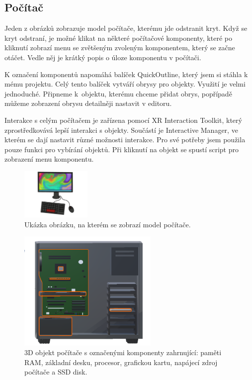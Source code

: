 \documentclass[12pt, a4paper,
twoside,        %
openright
]{report}
\begin{document}
\subsection{Počítač}	
Jeden z obrázků zobrazuje model počítače, kterému jde odstranit kryt. Když se kryt odstraní, je možné klikat na některé počítačové komponenty, které po kliknutí zobrazí menu se zvětšeným zvoleným komponentem, který se začne otáčet. Vedle něj je krátký popis o úloze komponentu v počítači.

K označení komponentů napomáhá balíček QuickOutline, který jsem si stáhla k mému projektu. Celý tento balíček vytváří obrysy pro objekty. Využití je velmi jednoduché. Připneme k~objektu, kterému chceme přidat obrys, popřípadě můžeme zobrazení obrysu detailněji nastavit v editoru. 

Interakce s celým počítačem je zařízena pomocí XR Interaction Toolkit, který zprostředkovává lepší interakci s objekty. Součástí je Interactive Manager, ve kterém se dají nastavit různé možnosti interakce. Pro své potřeby jsem použila pouze funkci pro vybírání objektů. Při kliknutí na objekt se spustí script pro zobrazení menu komponentu.


\begin{figure}[!h]
	\centering 
	\includegraphics[width=0.3\textwidth]{image/pcImage.png} 
	\caption{Ukázka obrázku, na kterém se zobrazí model počítače.} 
	\label{fig:pc_obrazek} 
\end{figure}

\begin{figure}[H]
	\centering 
	\includegraphics[width=0.6\textwidth]{image/pc.png} 
	\caption{3D objekt počítače s označenými komponenty zahrnující: paměti RAM, základní desku, procesor, grafickou kartu, napájecí zdroj počítače a SSD disk.} 
	\label{fig:pc} 
\end{figure}
\end{document}
